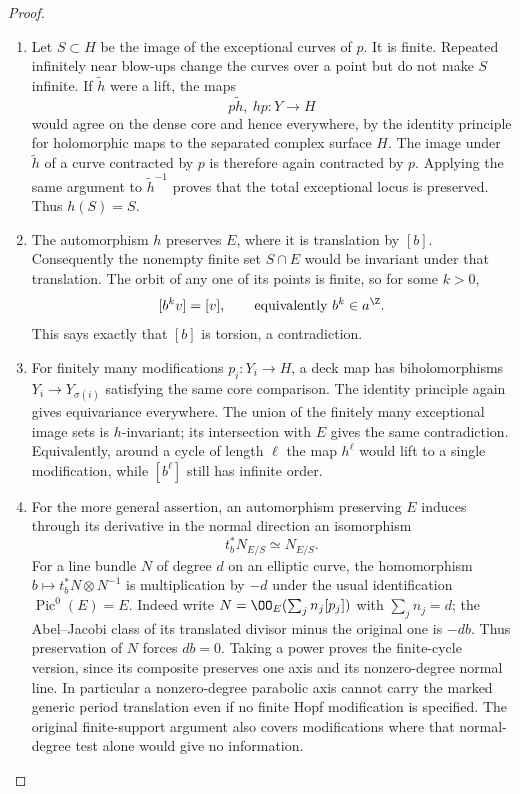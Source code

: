 \begin{proof}
\begin{enumerate}[label=\arabic*.,leftmargin=*]
\item Let $S\subset H$ be the image of the exceptional curves of $p$.
It is finite. Repeated infinitely near blow-ups change the curves
over a point but do not make $S$ infinite.
If $\widetilde h$ were a lift, the maps
\[
 p\widetilde h,\ hp:Y\longrightarrow H
\]
would agree on the dense core and hence everywhere, by the identity
principle for holomorphic maps to the separated complex surface $H$.
The image under $\widetilde h$ of a curve contracted by $p$ is
therefore again contracted by $p$. Applying the same argument to
$\widetilde h^{-1}$ proves that the total exceptional locus is
preserved. Thus $h(S)=S$.

\item The automorphism $h$ preserves $E$, where it is translation by
$[b]$. Consequently the nonempty finite set $S\cap E$ would be
invariant under that translation. The orbit of any one of its
points is finite, so for some $k>0$,
\[
 [b^k v]=[v],\qquad\text{equivalently } b^k\in a^\Z.
\]
This says exactly that $[b]$ is torsion, a contradiction.

\item For finitely many modifications $p_i:Y_i\to H$, a deck map has biholomorphisms
$Y_i\to Y_{\sigma(i)}$ satisfying the same core comparison.
The identity principle again gives equivariance everywhere.
The union of the finitely many exceptional image sets is
$h$-invariant; its intersection with $E$ gives the same contradiction.
Equivalently, around a cycle of length $\ell$ the map $h^\ell$
would lift to a single modification, while $[b^\ell]$ still has
infinite order.

\item For the more general assertion, an automorphism preserving $E$ induces through its derivative in the normal
direction an isomorphism
\[
 t_b^*N_{E/S}\simeq N_{E/S}.
\]
For a line bundle $N$ of degree $d$ on an elliptic curve, the
homomorphism $b\mapsto t_b^*N\otimes N^{-1}$ is multiplication
by $-d$ under the usual identification $\operatorname{Pic}^0(E)=E$.
Indeed write $N=\OO_E(\sum_j n_j[p_j])$ with
$\sum_j n_j=d$; the Abel--Jacobi class of its translated divisor
minus the original one is $-d b$.
Thus preservation of $N$ forces $d b=0$.
Taking a power proves the finite-cycle version, since its composite
preserves one axis and its nonzero-degree normal line.
In particular a nonzero-degree parabolic axis cannot carry the
marked generic period translation even if no finite Hopf
modification is specified. The original finite-support argument
also covers modifications where that normal-degree test alone
would give no information.


\end{enumerate}
\end{proof}
